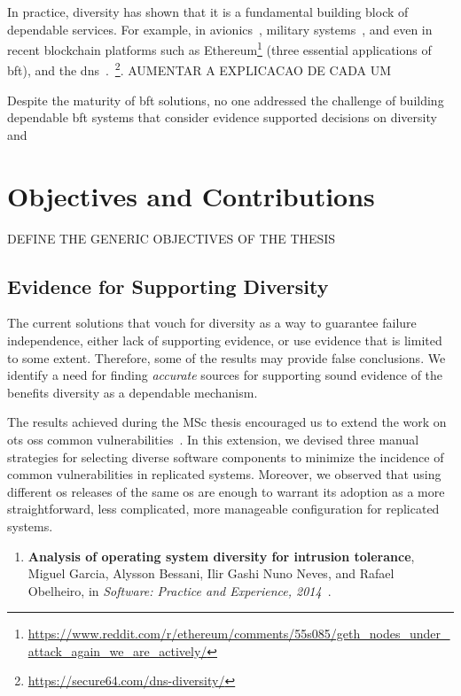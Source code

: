 In practice, diversity has shown that it is a fundamental building block of dependable services.
For example, in avionics~\cite{Yeh:2004}, military systems~\cite{rhimes}, and even in recent blockchain platforms such as Ethereum\footnote{\url{https://www.reddit.com/r/ethereum/comments/55s085/geth_nodes_under_attack_again_we_are_actively/}} (three essential applications of \gls{bft}), and the \gls{dns}~\cite{Shue:2013}.~\footnote{\url{https://secure64.com/dns-diversity/}}. 
AUMENTAR A EXPLICACAO DE CADA UM 


Despite the maturity of \gls{bft} solutions, no one addressed the challenge of building dependable \gls{bft} systems that consider evidence supported decisions on diversity and 



\section{Objectives and Contributions}

DEFINE THE GENERIC OBJECTIVES OF THE THESIS 

\subsection{Evidence for Supporting Diversity}%
The current solutions that vouch for diversity as a way to guarantee failure independence, either lack of supporting evidence, or use evidence that is limited to some extent.
Therefore, some of the results may provide false conclusions.
We identify a need for finding \emph{accurate} sources for supporting sound evidence of the benefits diversity as a dependable mechanism.


The results achieved during the MSc thesis encouraged us to extend the work on \gls{ots} \glspl{os} common vulnerabilities~\cite{Garcia:2012}.
In this extension, we devised three manual strategies for selecting diverse software components to minimize the incidence of common vulnerabilities in replicated systems.
Moreover, we observed that using different \gls{os} releases of the same \gls{os} are enough to warrant its adoption as a more straightforward, less complicated, more manageable configuration for replicated systems.

\begin{enumerate}
\item[1.] \textbf{Analysis of operating system diversity for intrusion tolerance}, Miguel Garcia, Alysson Bessani, Ilir Gashi Nuno Neves, and Rafael Obelheiro, in \emph{Software: Practice and Experience, 2014}~\cite{Garcia:2014}.
\end{enumerate}



